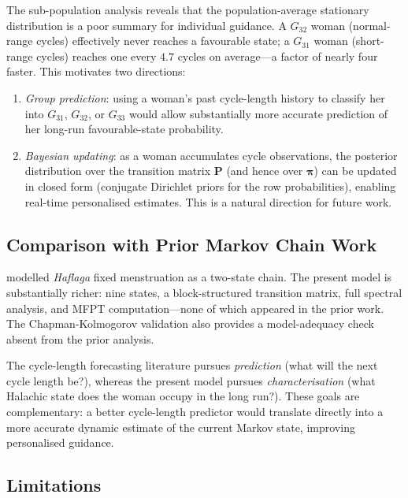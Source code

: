 \documentclass[12pt,a4paper]{article}
\newcommand{\piv}{\boldsymbol{\pi}}
\newcommand{\mat}[1]{\mathbf{#1}}
\newcommand{\haflaga}{\textit{Haflaga}}
\begin{document}
The sub-population analysis reveals that the population-average stationary
distribution is a poor summary for individual guidance.  A $G_{32}$ woman
(normal-range cycles) effectively never reaches a favourable state; a $G_{31}$
woman (short-range cycles) reaches one every $4.7$ cycles on average---a
factor of nearly four faster.  This motivates two directions:

\begin{enumerate}
  \item \emph{Group prediction}: using a woman's past cycle-length history to
        classify her into $G_{31}$, $G_{32}$, or $G_{33}$ would allow
        substantially more accurate prediction of her long-run favourable-state
        probability.
  \item \emph{Bayesian updating}: as a woman accumulates cycle observations,
        the posterior distribution over the transition matrix $\mat{P}$ (and hence
        over $\piv$) can be updated in closed form (conjugate Dirichlet priors
        for the row probabilities), enabling real-time personalised estimates.
        This is a natural direction for future work.
\end{enumerate}

\subsection{Comparison with Prior Markov Chain Work}

\citet{Ross2024markov} modelled \haflaga{} fixed menstruation as a two-state
chain.  The present model is substantially richer: nine states, a block-structured
transition matrix, full spectral analysis, and MFPT computation---none of which
appeared in the prior work.  The Chapman-Kolmogorov validation also provides a
model-adequacy check absent from the prior analysis.

The cycle-length forecasting literature \citep{Guo2006, Liao2018, Symul2019}
pursues \emph{prediction} (what will the next cycle length be?), whereas the
present model pursues \emph{characterisation} (what Halachic state does the
woman occupy in the long run?).  These goals are complementary: a better
cycle-length predictor would translate directly into a more accurate dynamic
estimate of the current Markov state, improving personalised guidance.

\subsection{Limitations}
\end{document}
